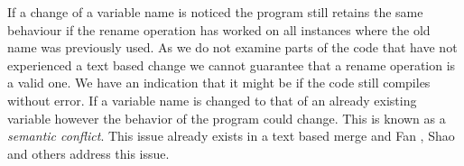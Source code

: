 If a change of a variable name is noticed the program still retains the same behaviour if the rename operation has worked on all instances where the old name was previously used.  As we do not examine parts of the code that have not experienced a text based change we cannot guarantee that a rename operation is a valid one. We have an indication that it might be if the code still compiles without error. If a variable name is changed to that of an already existing variable however the behavior of the program could change. This is known as a \emph{semantic conflict}.  This issue already exists in a text based merge and Fan \cite{Fan2012}, Shao \cite{Shao2009} and others address this issue. 

